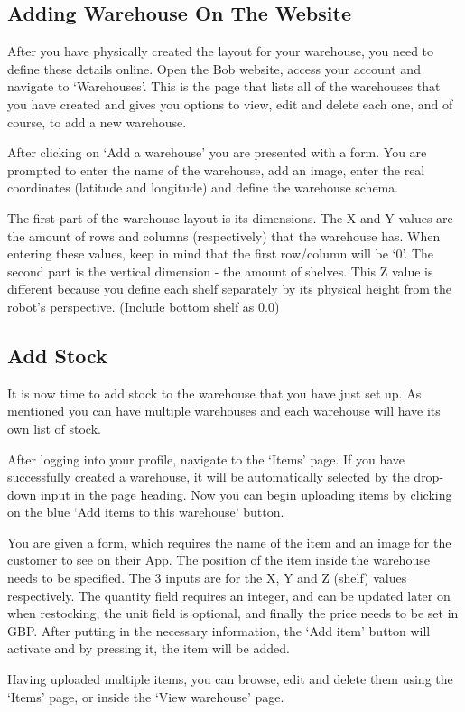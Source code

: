 \documentclass[onecolumn]{IEEEtran}
\begin{document}
\subsection{Adding Warehouse On The Website}
After you have physically created the layout for your warehouse, you need to define these details online. Open the Bob website, access your account and navigate to ‘Warehouses’. This is the page that lists all of the warehouses that you have created and gives you options to view, edit and delete each one, and of course, to add a new warehouse.
\par After clicking on ‘Add a warehouse’ you are presented with a form. You are prompted to enter the name of the warehouse, add an image, enter the real coordinates (latitude and longitude) and define the warehouse schema. 
\par The first part of the warehouse layout is its dimensions. The X and Y values are the amount of rows and columns (respectively) that the warehouse has. When entering these values, keep in mind that the first row/column will be ‘0’. The second part is the vertical dimension - the amount of shelves. This Z value is different because you define each shelf separately by its physical height from the robot's perspective. (Include bottom shelf as 0.0)

\subsection{Add Stock}
It is now time to add stock to the  warehouse that you have just set up. As mentioned you can have multiple warehouses and each warehouse will have its own list of stock. 
\par After logging into your profile, navigate to the ‘Items’ page. If you have successfully created a warehouse, it will be automatically selected by the drop-down input in the page heading. Now you can begin uploading items by clicking on the blue  ‘Add items to this warehouse’ button.
\par You are given a form, which requires the name of the item and an image for the customer to see on their App. The position of the item inside the warehouse needs to be specified. The 3 inputs are for the X, Y and Z (shelf) values respectively. The quantity field requires an integer, and can be updated later on when restocking, the unit field is optional, and finally the price needs to be set in GBP. After putting in the necessary information, the ‘Add item’ button will activate and by pressing it, the item will be added.
\par Having uploaded multiple items, you can browse, edit and delete them using the ‘Items’ page, or inside the ‘View warehouse’ page.
\end{document}
